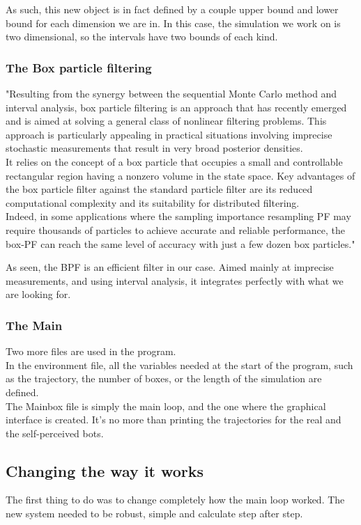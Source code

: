 As such, this new object is in fact defined by a couple upper bound and lower bound for each dimension we are in.
In this case, the simulation we work on is two dimensional, so the intervals have two bounds of each kind.
\subsubsection{The Box particle filtering}
"Resulting from the synergy between the sequential Monte Carlo method and interval analysis, box particle filtering is an approach that has recently emerged and is aimed at solving a general class of nonlinear filtering problems.
This approach is particularly appealing in practical situations involving imprecise stochastic measurements that result in very broad posterior densities.\\

It relies on the concept of a box particle that occupies a small and controllable rectangular region having a nonzero volume in the state space.
Key advantages of the box particle filter against the standard particle filter are its reduced computational complexity and its suitability for distributed filtering.\\

Indeed, in some applications where the sampling importance resampling PF may require thousands of particles to achieve accurate and reliable performance, the box-PF can reach the same level of accuracy with just a few dozen box particles."\parencite{BPF}

As seen, the BPF is an efficient filter in our case. Aimed mainly at imprecise measurements, and using interval analysis, it integrates perfectly with what we are looking for.

\subsubsection{The Main}
Two more files are used in the program.\\

In the environment file, all the variables needed at the start of the program,
 such as the trajectory, the number of boxes, or the length of the simulation are defined.\\

The Mainbox file is simply the main loop, and the one where the graphical interface is created. It's no more than printing the trajectories for the real and the self-perceived bots.

\subsection{Changing the way it works}
The first thing to do was to change completely how the main loop worked.
The new system needed to be robust, simple and calculate step after step.\\

